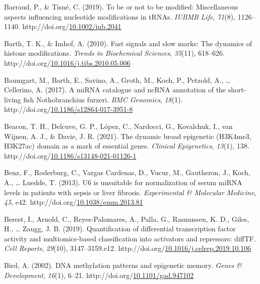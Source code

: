 \documentclass[12pt,twoside]{reedthesis}
\newlength{\cslhangindent}
\newenvironment{CSLReferences}[2] %
 {%
  \setlength{\parindent}{0pt}
  \ifodd #1 \everypar{\setlength{\hangindent}{\cslhangindent}}\ignorespaces\fi
  \ifnum #2 > 0
  \setlength{\parskip}{#2\baselineskip}
  \fi
 }%
 {}
\begin{document}
\begin{CSLReferences}{1}{0}
\leavevmode{}%
Barraud, P., \& Tisné, C. (2019). To be or not to be modified: Miscellaneous aspects influencing nucleotide modifications in tRNAs. \emph{IUBMB Life}, \emph{71}(8), 1126--1140. http://doi.org/\href{https://doi.org/10.1002/iub.2041}{10.1002/iub.2041}

\leavevmode{}%
Barth, T. K., \& Imhof, A. (2010). Fast signals and slow marks: The dynamics of histone modifications. \emph{Trends in Biochemical Sciences}, \emph{35}(11), 618--626. http://doi.org/\href{https://doi.org/10.1016/j.tibs.2010.05.006}{10.1016/j.tibs.2010.05.006}

\leavevmode{}%
Baumgart, M., Barth, E., Savino, A., Groth, M., Koch, P., Petzold, A., \ldots{} Cellerino, A. (2017). A miRNA catalogue and ncRNA annotation of the short-living fish Nothobranchius furzeri. \emph{BMC Genomics}, \emph{18}(1). http://doi.org/\href{https://doi.org/10.1186/s12864-017-3951-8}{10.1186/s12864-017-3951-8}

\leavevmode{}%
Beacon, T. H., Delcuve, G. P., López, C., Nardocci, G., Kovalchuk, I., van Wijnen, A. J., \& Davie, J. R. (2021). The dynamic broad epigenetic (H3K4me3, H3K27ac) domain as a mark of essential genes. \emph{Clinical Epigenetics}, \emph{13}(1), 138. http://doi.org/\href{https://doi.org/10.1186/s13148-021-01126-1}{10.1186/s13148-021-01126-1}

\leavevmode{}%
Benz, F., Roderburg, C., Vargas Cardenas, D., Vucur, M., Gautheron, J., Koch, A., \ldots{} Luedde, T. (2013). U6 is unsuitable for normalization of serum miRNA levels in patients with sepsis or liver fibrosis. \emph{Experimental \& Molecular Medicine}, \emph{45}, e42. http://doi.org/\href{https://doi.org/10.1038/emm.2013.81}{10.1038/emm.2013.81}

\leavevmode{}%
Berest, I., Arnold, C., Reyes-Palomares, A., Palla, G., Rasmussen, K. D., Giles, H., \ldots{} Zaugg, J. B. (2019). Quantification of differential transcription factor activity and multiomics-based classification into activators and repressors: diffTF. \emph{Cell Reports}, \emph{29}(10), 3147--3159.e12. http://doi.org/\href{https://doi.org/10.1016/j.celrep.2019.10.106}{10.1016/j.celrep.2019.10.106}

\leavevmode{}%
Bird, A. (2002). DNA methylation patterns and epigenetic memory. \emph{Genes \& Development}, \emph{16}(1), 6--21. http://doi.org/\href{https://doi.org/10.1101/gad.947102}{10.1101/gad.947102}


\end{CSLReferences}
\end{document}
